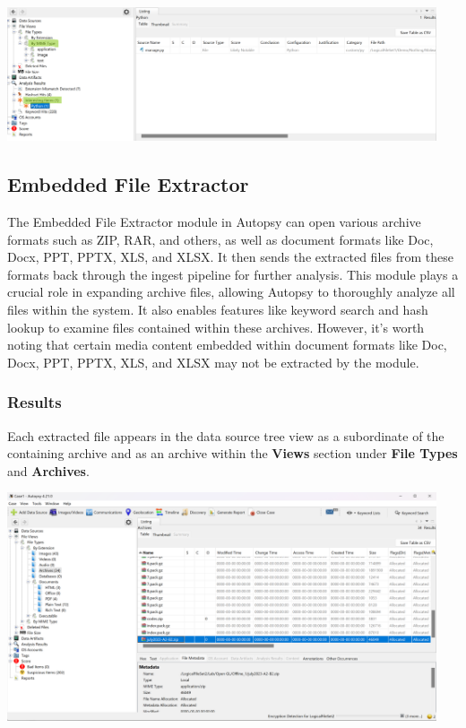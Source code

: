 \documentclass{article}
\begin{document}
\begin{center}
    \includegraphics[width=0.95\textwidth]{3/3.3/Custom File Type Identification Settings.png}
\end{center}

\subsection{Embedded File Extractor}
The Embedded File Extractor module in Autopsy can open various archive formats such as ZIP, RAR, and others, as well as document formats like Doc, Docx, PPT, PPTX, XLS, and XLSX. It then sends the extracted files from these formats back through the ingest pipeline for further analysis. This module plays a crucial role in expanding archive files, allowing Autopsy to thoroughly analyze all files within the system. It also enables features like keyword search and hash lookup to examine files contained within these archives. However, it's worth noting that certain media content embedded within document formats like Doc, Docx, PPT, PPTX, XLS, and XLSX may not be extracted by the module.

\subsubsection*{Results}
Each extracted file appears in the data source tree view as a subordinate of the containing archive and as an archive within the \textbf{Views} section under \textbf{File Types } and \textbf{Archives}.

\begin{center}
    \includegraphics[width=0.95\textwidth]{3/3.4/Embedded File Extractor Results.png}
\end{center}
\end{document}
